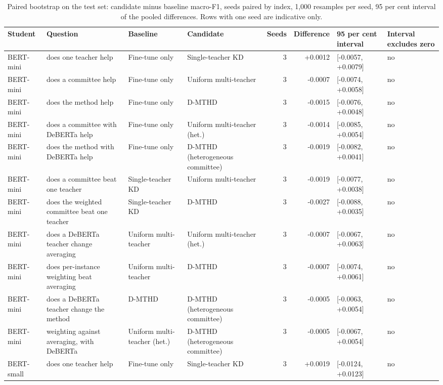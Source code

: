 \begin{table}[t]
\centering
\caption{Paired bootstrap on the test set: candidate minus baseline macro-F1, seeds paired by index, 1,000 resamples per seed, 95 per cent interval of the pooled differences. Rows with one seed are indicative only.}
\label{tab:significance}
\begin{tabular}{llllrrll}
\toprule
Student & Question & Baseline & Candidate & Seeds & Difference & 95 per cent interval & Interval excludes zero \\
\midrule
BERT-mini & does one teacher help & Fine-tune only & Single-teacher KD & 3 & +0.0012 & [-0.0057, +0.0079] & no \\
BERT-mini & does a committee help & Fine-tune only & Uniform multi-teacher & 3 & -0.0007 & [-0.0074, +0.0058] & no \\
BERT-mini & does the method help & Fine-tune only & D-MTHD & 3 & -0.0015 & [-0.0076, +0.0048] & no \\
BERT-mini & does a committee with DeBERTa help & Fine-tune only & Uniform multi-teacher (het.) & 3 & -0.0014 & [-0.0085, +0.0054] & no \\
BERT-mini & does the method with DeBERTa help & Fine-tune only & D-MTHD (heterogeneous committee) & 3 & -0.0019 & [-0.0082, +0.0041] & no \\
BERT-mini & does a committee beat one teacher & Single-teacher KD & Uniform multi-teacher & 3 & -0.0019 & [-0.0077, +0.0038] & no \\
BERT-mini & does the weighted committee beat one teacher & Single-teacher KD & D-MTHD & 3 & -0.0027 & [-0.0088, +0.0035] & no \\
BERT-mini & does a DeBERTa teacher change averaging & Uniform multi-teacher & Uniform multi-teacher (het.) & 3 & -0.0007 & [-0.0067, +0.0063] & no \\
BERT-mini & does per-instance weighting beat averaging & Uniform multi-teacher & D-MTHD & 3 & -0.0007 & [-0.0074, +0.0061] & no \\
BERT-mini & does a DeBERTa teacher change the method & D-MTHD & D-MTHD (heterogeneous committee) & 3 & -0.0005 & [-0.0063, +0.0054] & no \\
BERT-mini & weighting against averaging, with DeBERTa & Uniform multi-teacher (het.) & D-MTHD (heterogeneous committee) & 3 & -0.0005 & [-0.0067, +0.0054] & no \\
BERT-small & does one teacher help & Fine-tune only & Single-teacher KD & 3 & +0.0019 & [-0.0124, +0.0123] & no \\

\end{tabular}
\end{table}
